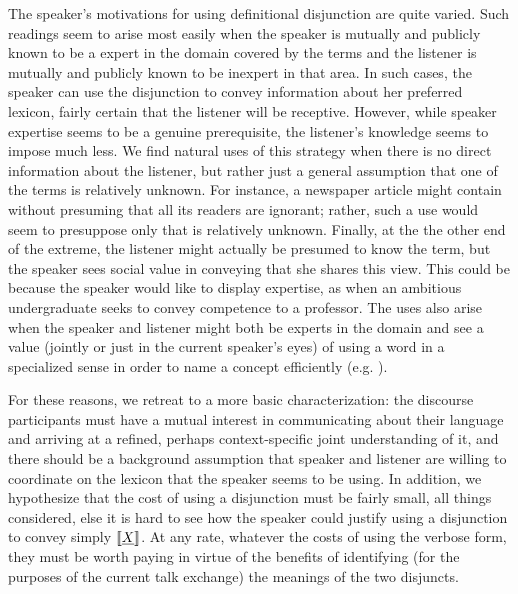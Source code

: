 \documentclass{article}
\begin{document}
The speaker's motivations for using definitional disjunction are quite
varied. Such readings seem to arise most easily when the speaker is
mutually and publicly known to be a expert in the domain covered by
the terms and the listener is mutually and publicly known to be
inexpert in that area. In such cases, the speaker can use the
disjunction to convey information about her preferred lexicon, fairly
certain that the listener will be receptive. However, while speaker
expertise seems to be a genuine prerequisite, the listener's knowledge
seems to impose much less.  We find natural uses of this strategy when
there is no direct information about the listener, but rather just a
general assumption that one of the terms is relatively unknown. For
instance, a newspaper article might contain  without presuming that all its readers are ignorant;
rather, such a use would seem to presuppose only that 
is relatively unknown.  Finally, at the the other end of the extreme,
the listener might actually be presumed to know the term, but the
speaker sees social value in conveying that she shares this view. This
could be because the speaker would like to display expertise, as when
an ambitious undergraduate seeks to convey competence to a professor.
The uses also arise when the speaker and listener might both be
experts in the domain and see a value (jointly or just in the current
speaker's eyes) of using a word in a specialized sense in order to
name a concept efficiently (e.g. ).

For these reasons, we retreat to a more basic characterization: the
discourse participants must have a mutual interest in communicating
about their language and arriving at a refined, perhaps
context-specific joint understanding of it, and there should be a
background assumption that speaker and listener are willing to
coordinate on the lexicon that the speaker seems to be using. In
addition, we hypothesize that the cost of using a disjunction must be
fairly small, all things considered, else it is hard to see how the
speaker could justify using a disjunction  to convey
simply $\llbracket\emph{X}\rrbracket$. At any rate, whatever the costs of using the
verbose form, they must be worth paying in virtue of the benefits of
identifying (for the purposes of the current talk exchange) the
meanings of the two disjuncts.

\end{document}
